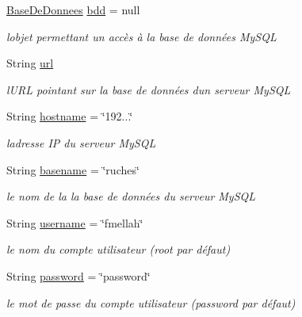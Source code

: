 \begin{DoxyCompactItemize}
\item 
\hyperlink{classfr_1_1campus_1_1laurainc_1_1honeybee_1_1_base_de_donnees}{Base\+De\+Donnees} \hyperlink{classfr_1_1campus_1_1laurainc_1_1honeybee_1_1_main_activity_ae01aec19dc79f2c48d1807ccb2d3fa4a}{bdd} = null
\begin{DoxyCompactList}\small\item\em l\textquotesingle{}objet permettant un accès à la base de données My\+S\+QL \end{DoxyCompactList}\item 
String \hyperlink{classfr_1_1campus_1_1laurainc_1_1honeybee_1_1_main_activity_adbea1c677048c193ef00a08987905bfa}{url}
\begin{DoxyCompactList}\small\item\em l\textquotesingle{}U\+RL pointant sur la base de données d\textquotesingle{}un serveur My\+S\+QL \end{DoxyCompactList}\item 
String \hyperlink{classfr_1_1campus_1_1laurainc_1_1honeybee_1_1_main_activity_a2d1880e0a470661caaa2610d68299821}{hostname} = \char`\"{}192...\char`\"{}
\begin{DoxyCompactList}\small\item\em l\textquotesingle{}adresse IP du serveur My\+S\+QL \end{DoxyCompactList}\item 
String \hyperlink{classfr_1_1campus_1_1laurainc_1_1honeybee_1_1_main_activity_a14d932c5d8ba352ebd01cc984110adf3}{basename} = \char`\"{}ruches\char`\"{}
\begin{DoxyCompactList}\small\item\em le nom de la la base de données du serveur My\+S\+QL \end{DoxyCompactList}\item 
String \hyperlink{classfr_1_1campus_1_1laurainc_1_1honeybee_1_1_main_activity_a1acb2db3f66e167ea225e281d900f842}{username} = \char`\"{}fmellah\char`\"{}
\begin{DoxyCompactList}\small\item\em le nom du compte utilisateur (root par défaut) \end{DoxyCompactList}\item 
String \hyperlink{classfr_1_1campus_1_1laurainc_1_1honeybee_1_1_main_activity_a3cc5f979af0f495f346052f51bd8cd66}{password} = \char`\"{}password\char`\"{}
\begin{DoxyCompactList}\small\item\em le mot de passe du compte utilisateur (password par défaut) \end{DoxyCompactList}\item 

\end{DoxyCompactItemize}

